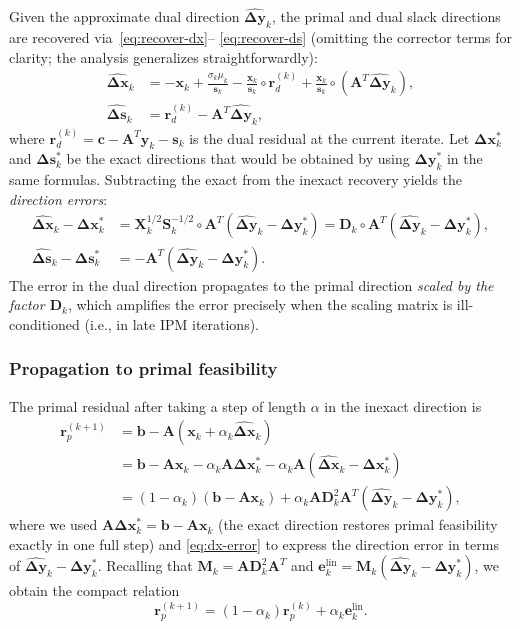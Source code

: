 \documentclass[11pt,twoside]{article}
\newcommand{\bA}{\mathbf{A}}
\newcommand{\bb}{\mathbf{b}}
\newcommand{\bc}{\mathbf{c}}
\newcommand{\bx}{\mathbf{x}}
\newcommand{\by}{\mathbf{y}}
\newcommand{\bs}{\mathbf{s}}
\newcommand{\bD}{\mathbf{D}}
\newcommand{\be}{\mathbf{e}}
\newcommand{\bM}{\mathbf{M}}
\newcommand{\bS}{\mathbf{S}}
\newcommand{\bX}{\mathbf{X}}
\newcommand{\br}{\mathbf{r}}
\newcommand{\bDelta}{\mathbf{\Delta}}
\begin{document}
Given the approximate dual direction $\widehat{\bDelta\by}_k$, the primal
and dual slack directions are recovered via~\eqref{eq:recover-dx}--
\eqref{eq:recover-ds} (omitting the corrector terms for clarity; the
analysis generalizes straightforwardly):
\begin{align}
  \widehat{\bDelta\bx}_k &=
    -\bx_k
    + \frac{\sigma_k\mu_k}{\bs_k}
    - \frac{\bx_k}{\bs_k} \circ \br_d^{(k)}
    + \frac{\bx_k}{\bs_k} \circ (\bA^T\widehat{\bDelta\by}_k),
    \label{eq:inexact-recover-dx} \\[4pt]
  \widehat{\bDelta\bs}_k &=
    \br_d^{(k)} - \bA^T\widehat{\bDelta\by}_k,
    \label{eq:inexact-recover-ds}
\end{align}
where $\br_d^{(k)} = \bc - \bA^T\by_k - \bs_k$ is the dual residual at
the current iterate.  Let $\bDelta\bx_k^*$ and $\bDelta\bs_k^*$ be the
exact directions that would be obtained by using $\bDelta\by_k^*$ in the
same formulas.  Subtracting the exact from the inexact recovery yields the
\emph{direction errors}:
\begin{align}
  \widehat{\bDelta\bx}_k - \bDelta\bx_k^* &=
    \bX_k^{1/2}\bS_k^{-1/2} \circ
    \bA^T(\widehat{\bDelta\by}_k - \bDelta\by_k^*)
    = \bD_k \circ \bA^T(\widehat{\bDelta\by}_k - \bDelta\by_k^*),
    \label{eq:dx-error} \\[4pt]
  \widehat{\bDelta\bs}_k - \bDelta\bs_k^* &=
    -\bA^T(\widehat{\bDelta\by}_k - \bDelta\by_k^*).
    \label{eq:ds-error}
\end{align}
The error in the dual direction propagates to the primal direction
\emph{scaled by the factor $\bD_k$}, which amplifies the error precisely
when the scaling matrix is ill-conditioned (i.e., in late IPM iterations).

\subsubsection{Propagation to primal feasibility}

The primal residual after taking a step of length $\alpha$ in the inexact
direction is
\begin{align}
  \br_p^{(k+1)}
    &= \bb - \bA(\bx_k + \alpha_k \widehat{\bDelta\bx}_k) \nonumber \\
    &= \bb - \bA\bx_k
       - \alpha_k \bA\bDelta\bx_k^*
       - \alpha_k \bA(\widehat{\bDelta\bx}_k - \bDelta\bx_k^*) \nonumber \\
    &= (1 - \alpha_k)(\bb - \bA\bx_k)
       + \alpha_k \bA\bD_k^2\bA^T
         (\widehat{\bDelta\by}_k - \bDelta\by_k^*),
    \label{eq:feas-prop}
\end{align}
where we used $\bA\bDelta\bx_k^* = \bb - \bA\bx_k$ (the exact direction
restores primal feasibility exactly in one full step) and
\eqref{eq:dx-error} to express the direction error in terms of
$\widehat{\bDelta\by}_k - \bDelta\by_k^*$.  Recalling that
$\bM_k = \bA\bD_k^2\bA^T$ and $\be_k^{\text{lin}} =
\bM_k(\widehat{\bDelta\by}_k - \bDelta\by_k^*)$, we obtain the compact
relation
\begin{equation}
  \boxed{\br_p^{(k+1)} =
    (1 - \alpha_k)\br_p^{(k)} + \alpha_k \be_k^{\text{lin}}}.
  \label{eq:feas-prop-final}
\end{equation}
\end{document}

